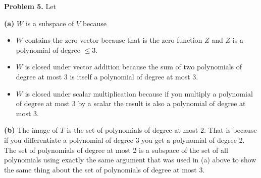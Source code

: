 \documentclass[oneside,12pt]{amsart}
\begin{document}
\bigskip

\textbf{Problem 5.} Let

\textbf{(a)} $W$ is a subspace of $V$ because
\begin{itemize}
\item $W$ contains the zero vector because that is the zero function $Z$ and
$Z$ is a polynomial of degree $\leq 3$.
\item $W$ is closed under vector addition because the sum of two polynomials
of degree at most 3 is itself a polynomial of degree at most 3.
\item $W$ is closed under scalar multiplication because if you multiply
a polynomial of degree at most 3 by a scalar the result is also a polynomial
of degree at most 3.
\end{itemize}

\bigskip

\textbf{(b)} The image of $T$ is the set of polynomials of degree at most 2.
That is because if you differentiate a polynomial of degree 3 you get a
polynomial of degree 2. The set of polynomials of degree at most 2 is a
subspace of the set of all polynomials using exactly the same argument
that was used in (a) above to show the same thing about the set of
polynomials of degree at most 3.
\end{document}
